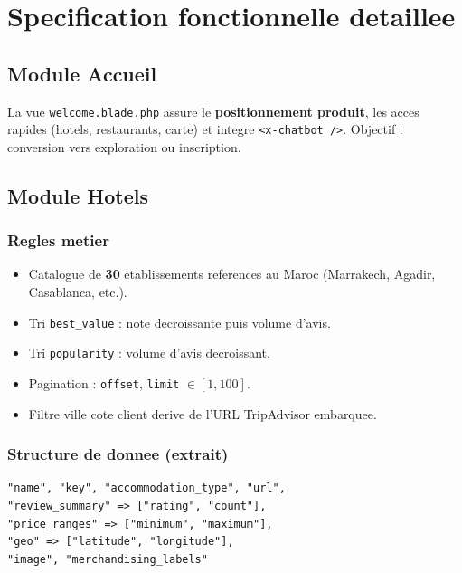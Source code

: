\chapter{Specification fonctionnelle detaillee}
\label{ch:features}

\section{Module Accueil}

La vue \texttt{welcome.blade.php} assure le \textbf{positionnement produit}, les acces rapides (hotels, restaurants, carte) et integre \texttt{<x-chatbot />}. Objectif : conversion vers exploration ou inscription.


\section{Module Hotels}

\subsection{Regles metier}

\begin{itemize}
  \item Catalogue de \textbf{30} etablissements references au Maroc (Marrakech, Agadir, Casablanca, etc.).
  \item Tri \texttt{best\_value} : note decroissante puis volume d'avis.
  \item Tri \texttt{popularity} : volume d'avis decroissant.
  \item Pagination : \texttt{offset}, \texttt{limit} $\in [1,100]$.
  \item Filtre ville cote client derive de l'URL TripAdvisor embarquee.
\end{itemize}

\subsection{Structure de donnee (extrait)}

\begin{lstlisting}[caption={Champs type d'un hotel (HotelController)}]
"name", "key", "accommodation_type", "url",
"review_summary" => ["rating", "count"],
"price_ranges" => ["minimum", "maximum"],
"geo" => ["latitude", "longitude"],
"image", "merchandising_labels"
\end{lstlisting}

